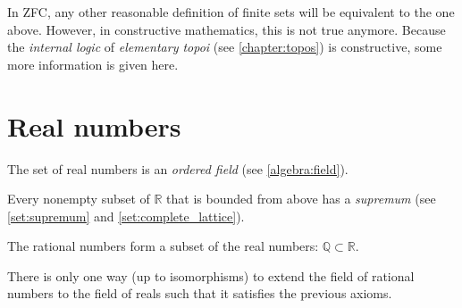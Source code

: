     In ZFC, any other reasonable definition of finite sets will be equivalent to the one above. However, in constructive mathematics, this is not true anymore. Because the \textit{internal logic} of \textit{elementary topoi} (see \cref{chapter:topos}) is constructive, some more information is given here.




\section{Real numbers}

    \begin{axiom}[Ordering]
        The set of real numbers is an \textit{ordered field} (see \cref{algebra:field}).
    \end{axiom}
    \begin{axiom}\label{set:dedekind_completeness}
        Every nonempty subset of $\mathbb{R}$ that is bounded from above has a \textit{supremum} (see \cref{set:supremum} and \cref{set:complete_lattice}).
    \end{axiom}

    \begin{axiom}
        The rational numbers form a subset of the real numbers: $\mathbb{Q}\subset\mathbb{R}$.
    \end{axiom}

    \begin{remark}
        There is only one way (up to isomorphisms) to extend the field of rational numbers to the field of reals such that it satisfies the previous axioms.
    \end{remark}


